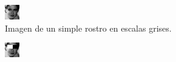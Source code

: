 \documentclass[a4paper,openright,12pt]{report}
\begin{document}
\begin{enumerate}
    \begin{figure}[H]
      \begin{subfigure}[b]{0.4\textwidth}
        \includegraphics[width=\textwidth]{../images/haar-face1.png}
        \caption{Imagen de un simple rostro en escalas grises.}
        \label{fig:haar-face}
      \end{subfigure}
      \hfill
      \begin{subfigure}[b]{0.4\textwidth}
        \includegraphics[width=\textwidth]{../images/haar-face2.png}

\end{subfigure}
\end{figure}
\end{enumerate}
\end{document}

